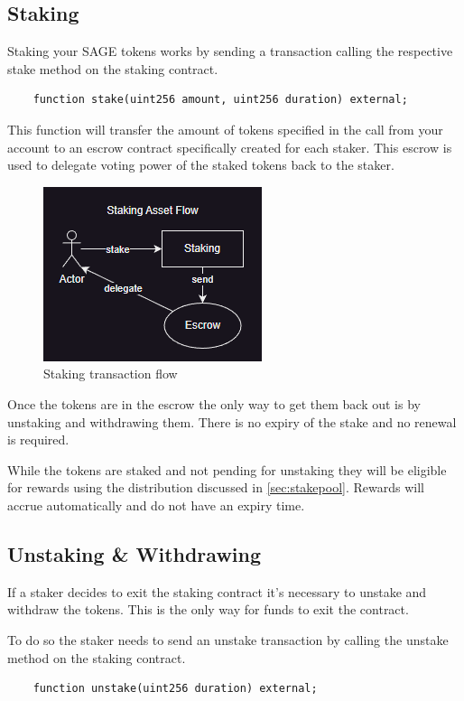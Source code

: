 \documentclass{article}
\begin{document}
\subsection{Staking}

Staking your SAGE tokens works by sending a transaction calling the respective stake method on the staking contract.
\begin{verbatim}
    function stake(uint256 amount, uint256 duration) external;
\end{verbatim}

This function will transfer the amount of tokens specified in the call from your account to an escrow contract specifically created for each staker. This escrow is used to delegate voting power of the 
staked tokens back to the staker.

\begin{figure}[h!]
\centering
\includegraphics[width=0.5\linewidth]{stake-tx.png}
\caption{Staking transaction flow}
\label{fig:stake-tx-flow}
\end{figure}

Once the tokens are in the escrow the only way to get them back out is by unstaking and withdrawing them. There is no expiry of the stake and no renewal is required.

While the tokens are staked and not pending for unstaking they will be eligible for rewards using the distribution discussed in \ref{sec:stakepool}. Rewards will accrue automatically and do not have an expiry time.

\subsection{Unstaking \& Withdrawing}

If a staker decides to exit the staking contract it's necessary to unstake and withdraw the tokens.
This is the only way for funds to exit the contract.

To do so the staker needs to send an unstake transaction by calling the unstake method on the staking contract.
\begin{verbatim}
    function unstake(uint256 duration) external;
\end{verbatim}
\end{document}
